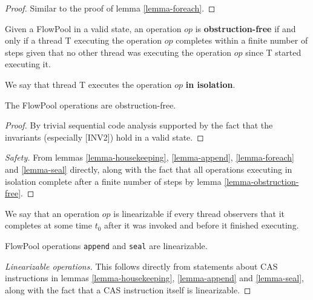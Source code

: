 \documentclass[runningheads,a4paper]{llncs}
\begin{document}
\begin{proof}
Similar to the proof of lemma \ref{lemma-foreach}.
\end{proof}


\begin{definition}
Given a FlowPool in a valid state, an operation $op$ is
\textbf{obstruction-free} if and only if a thread T executing the
operation $op$ completes within a finite number of steps given that
no other thread was executing the operation $op$ since T started executing it.

We say that thread T executes the operation $op$ \textbf{in isolation}.
\end{definition}


\begin{lemma}\label{lemma-obstruction-free}
The FlowPool operations are obstruction-free.
\end{lemma}

\begin{proof}
By trivial sequential code analysis supported by the fact that the
invariants (especially [INV2]) hold in a valid state.
\end{proof}


\begin{proof}[Safety]
From lemmas \ref{lemma-housekeeping}, \ref{lemma-append}, \ref{lemma-foreach} and
\ref{lemma-seal} directly, along with the fact that all operations
executing in isolation complete after a finite number of steps by lemma \ref{lemma-obstruction-free}.
\end{proof}


\begin{definition}[Linearizability]
We say that an operation $op$ is linearizable if every thread
observers that it completes at some time $t_0$ after it was invoked
and before it finished executing.
\end{definition}


\begin{theorem}
FlowPool operations \verb=append= and \verb=seal= are linearizable.
\end{theorem}

\begin{proof}[Linearizable operations]
This follows directly from statements about CAS instructions in lemmas \ref{lemma-housekeeping},
\ref{lemma-append} and \ref{lemma-seal}, along with the fact that a
CAS instruction itself is linearizable.
\end{proof}
\end{document}
